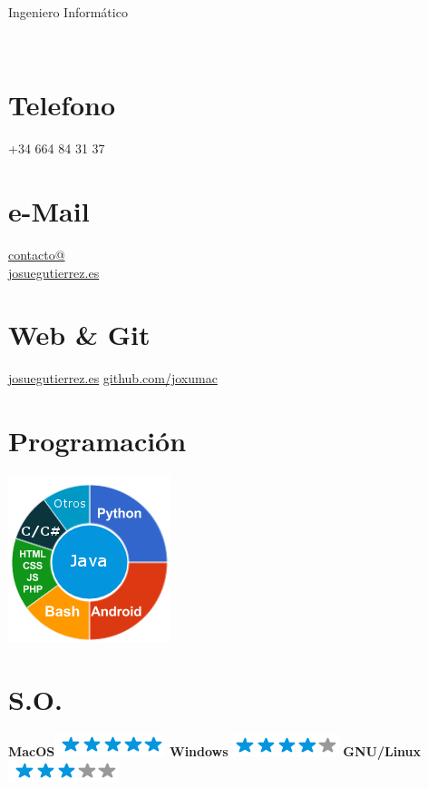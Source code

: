 \documentclass[]{friggeri-cv}
\begin{document}
      {Ingeniero Informático}
      

\begin{aside}
    ~
    ~
    ~
    ~
    ~
  \section{Telefono}
    +34 664 84 31 37
    ~
  \section{e-Mail}
    \href{mailto:contacto@josuegutierrez.es}{contacto@\\josuegutierrez.es}
    ~
  \section{Web \& Git}
    \href{http://www.josuegutierrez.es}{josuegutierrez.es}
    \href{https://github.com/JoxuMac}{github.com/joxumac}
    ~
  \section{Programación}
    \includegraphics[scale=0.62]{img/programming2.png}
    ~
  \section{S.O.}
    \textbf{MacOS}\includegraphics[scale=0.40]{img/5stars.png}
    \textbf{Windows}\includegraphics[scale=0.40]{img/4stars.png}
    \textbf{GNU/Linux}\includegraphics[scale=0.40]{img/3stars.png}
    ~

\end{aside}
\end{document}

